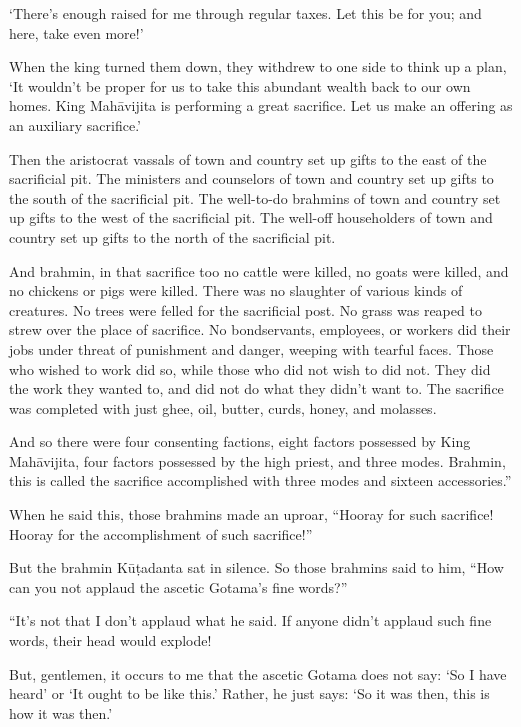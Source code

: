 \documentclass[12pt,openany]{book}%
\begin{document}
‘There’s enough raised for me through regular taxes. Let this be for you; and here, take even more!’ 

When the king turned them down, they withdrew to one side to think up a plan, ‘It wouldn’t be proper for us to take this abundant wealth back to our own homes. King \textsanskrit{Mahāvijita} is performing a great sacrifice. Let us make an offering as an auxiliary sacrifice.’ 

Then the aristocrat vassals of town and country set up gifts to the east of the sacrificial pit. The ministers and counselors of town and country set up gifts to the south of the sacrificial pit. The well-to-do brahmins of town and country set up gifts to the west of the sacrificial pit. The well-off householders of town and country set up gifts to the north of the sacrificial pit. 

And brahmin, in that sacrifice too no cattle were killed, no goats were killed, and no chickens or pigs were killed. There was no slaughter of various kinds of creatures. No trees were felled for the sacrificial post. No grass was reaped to strew over the place of sacrifice. No bondservants, employees, or workers did their jobs under threat of punishment and danger, weeping with tearful faces. Those who wished to work did so, while those who did not wish to did not. They did the work they wanted to, and did not do what they didn’t want to. The sacrifice was completed with just ghee, oil, butter, curds, honey, and molasses. 

And so there were four consenting factions, eight factors possessed by King \textsanskrit{Mahāvijita}, four factors possessed by the high priest, and three modes. Brahmin, this is called the sacrifice accomplished with three modes and sixteen accessories.” 

When he said this, those brahmins made an uproar, “Hooray for such sacrifice! Hooray for the accomplishment of such sacrifice!” 

But the brahmin \textsanskrit{Kūṭadanta} sat in silence. So those brahmins said to him, “How can you not applaud the ascetic Gotama’s fine words?” 

“It’s not that I don’t applaud what he said. If anyone didn’t applaud such fine words, their head would explode! 

But, gentlemen, it occurs to me that the ascetic Gotama does not say: ‘So I have heard’ or ‘It ought to be like this.’ Rather, he just says: ‘So it was then, this is how it was then.’ 
\end{document}
